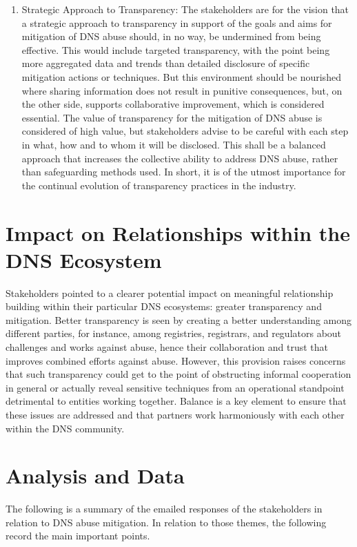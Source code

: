 \begin{enumerate}
    \item Strategic Approach to Transparency: The stakeholders are for the vision that a strategic approach to transparency in support of the goals and aims for mitigation of DNS abuse should, in no way, be undermined from being effective. This would include targeted transparency, with the point being more aggregated data and trends than detailed disclosure of specific mitigation actions or techniques. But this environment should be nourished where sharing information does not result in punitive consequences, but, on the other side, supports collaborative improvement, which is considered essential. The value of transparency for the mitigation of DNS abuse is considered of high value, but stakeholders advise to be careful with each step in what, how and to whom it will be disclosed. This shall be a balanced approach that increases the collective ability to address DNS abuse, rather than safeguarding methods used. In short, it is of the utmost importance for the continual evolution of transparency practices in the industry.


\end{enumerate}

\section{Impact on Relationships within the DNS Ecosystem} 

 Stakeholders pointed to a clearer potential impact on meaningful relationship building within their particular DNS ecosystems: greater transparency and mitigation. Better transparency is seen by creating a better understanding among different parties, for instance, among registries, registrars, and regulators about challenges and works against abuse, hence their collaboration and trust that improves combined efforts against abuse. However, this provision raises concerns that such transparency could get to the point of obstructing informal cooperation in general or actually reveal sensitive techniques from an operational standpoint detrimental to entities working together. Balance is a key element to ensure that these issues are addressed and that partners work harmoniously with each other within the DNS community.

\section{Analysis and Data } 

The following is a summary of the emailed responses of the stakeholders in relation to DNS abuse mitigation. In relation to those themes, the following record the main important points.


